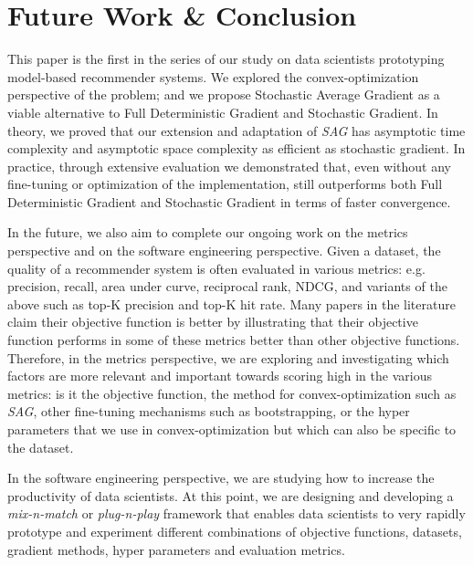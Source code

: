 \section{Future Work \& Conclusion}
This paper is the first in the series of our study on data scientists prototyping model-based recommender systems.  
We explored the convex-optimization perspective of the problem; and we propose Stochastic Average Gradient as a viable alternative to Full Deterministic Gradient and Stochastic Gradient.  
In theory, we proved that our extension and adaptation of \emph{SAG} has asymptotic time complexity and asymptotic space complexity as efficient as stochastic gradient.  
In practice, through extensive evaluation we demonstrated that, even without any fine-tuning or optimization of the implementation, 
\tool still outperforms both Full Deterministic Gradient and Stochastic Gradient in terms of faster convergence.

In the future, we also aim to complete our ongoing work on the metrics perspective and on the software engineering perspective.  
Given a dataset, the quality of a recommender system is often evaluated in various metrics: 
e.g. precision, recall, area under curve, reciprocal rank, NDCG, and variants of the above such as top-K precision and top-K hit rate.
Many papers in the literature claim their objective function is better by illustrating that their objective function performs in some of these metrics better than other objective functions.  
Therefore, in the metrics perspective, we are exploring and investigating which factors are more relevant and important towards scoring high in the various metrics: 
is it the objective function, the method for convex-optimization such as \emph{SAG}, other fine-tuning mechanisms such as bootstrapping, 
or the hyper parameters that we use in convex-optimization but which can also be specific to the dataset. 

In the software engineering perspective, we are studying how to increase the productivity of data scientists.  
At this point, we are designing and developing a \emph{mix-n-match} or \emph{plug-n-play} framework that enables data scientists to very rapidly prototype and 
experiment different combinations of objective functions, datasets, gradient methods, hyper parameters and evaluation metrics.  
